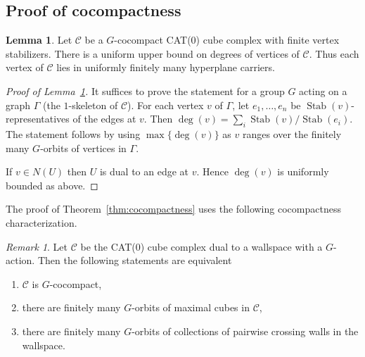 \documentclass[12pt,oneside]{amsart}
\theoremstyle{definition}
\newtheorem{lem}[thm]{Lemma}
\theoremstyle{definition}
\theoremstyle{remark}
\newtheorem{rem}[thm]{Remark}
\newcommand{\C}{\mathcal{C}}
\DeclareMathOperator{\Stab}{Stab}
\begin{document}
\subsection{Proof of cocompactness}\label{subsec:proof of cocompactness}

\begin{lem}\label{lem:uniform degree}
    Let $\C$ be a $G$-cocompact CAT(0) cube complex with finite vertex stabilizers. There is a uniform upper bound on degrees of vertices of $\C$.
Thus each vertex of $\C$ lies in uniformly finitely many hyperplane carriers.
\end{lem}


\begin{proof}[Proof of Lemma~\ref{lem:uniform degree}] It suffices to prove the statement for a group $G$ acting on a graph $\Gamma$ (the $1$-skeleton of $\C$).
For each vertex $v$ of $\Gamma$,
let $e_1,\dots, e_n$ be $\Stab(v)$-representatives of the edges at $v$.
Then $\deg(v)=\sum_i \Stab(v)/\Stab(e_i)$. The statement follows by using $\max\{\deg(v)\}$ as $v$ ranges over the finitely many $G$-orbits of vertices in $\Gamma$.

If $v\in N(U)$
then $U$ is dual to an edge at $v$.
Hence $\deg(v)$ is uniformly bounded as above.
\end{proof}




The proof of Theorem~\ref{thm:cocompactness} uses the following %
cocompactness
characterization.

\begin{rem}\label{rem:cocompactness}
Let $\C$ be the CAT(0) cube complex dual to a wallspace with a $G$-action.
Then the following statements are equivalent
\begin{enumerate}
    \item\label{rmk:characerization cocompact 1} $\C$ is $G$-cocompact,
\item\label{rmk:characerization cocompact 2}  there are finitely many $G$-orbits  of maximal cubes in $\C$, 
\item\label{rmk:characerization cocompact 3}  there are finitely many $G$-orbits of collections of pairwise crossing walls in the wallspace.
\end{enumerate}
\end{rem}
\end{document}
